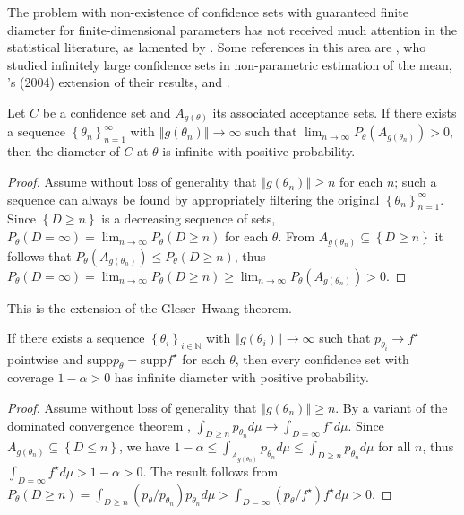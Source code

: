 \documentclass[twoside]{article}
\begin{document}
The problem with non-existence
of confidence sets with guaranteed finite diameter for finite-dimensional
parameters has not received much attention in the statistical literature,
as lamented by \citet{gleser996bootstrap}. Some references in this
area are \citet{bahadur1956nonexistence}, who studied infinitely
large confidence sets in non-parametric estimation of the mean, \citeauthor{romano2004non}'s
(2004) extension of their results, \citet{Donoho1988-hg} and \citet{Pfanzagl1998-fe}.
\begin{lem}
Let $C$ be a confidence set and $A_{g(\theta)}$ its associated
acceptance sets. If there exists a sequence $\left\{ \theta_{n}\right\} _{n=1}^{\infty}$
with $\left\Vert g(\theta_{n})\right\Vert \to\infty$ such
that $\lim_{n\to\infty}P_{\theta}(A_{g(\theta_{n})})>0,$then
the diameter of $C$ at $\theta$ is infinite with positive probability.
\end{lem}
\begin{proof}
Assume without loss of generality that $\left\Vert g(\theta_{n})\right\Vert \geq n$
for each $n$; such a sequence can always be found by appropriately
filtering the original $\left\{ \theta_{n}\right\} _{n=1}^{\infty}$.
Since $\left\{ D\geq n\right\} $ is a decreasing sequence of sets,
$P_{\theta}(D=\infty)=\lim_{n\to\infty}P_{\theta}(D\geq n)$
for each $\theta$. From $A_{g(\theta_{n})}\subseteq\left\{ D\geq n\right\} $
it follows that $P_{\theta}(A_{g(\theta_{n})})\leq P_{\theta}(D\geq n)$,
thus $P_{\theta}(D=\infty)=\lim_{n\to\infty}P_{\theta}(D\geq n)\geq\lim_{n\to\infty}P_{\theta}(A_{g(\theta_{n})})>0$.
\end{proof}
This is the extension of the Gleser--Hwang theorem.
\begin{thm}
\label{thm:Infinite diameter main theorem}If there exists a sequence
$\left\{ \theta_{i}\right\} _{i\in\mathbb{N}}$ with $\left\Vert g(\theta_{i})\right\Vert \to\infty$
such that $p_{\theta_{i}}\to f^{\star}$ pointwise and $\textrm{supp}p_{\theta}=\textrm{supp}f^{\star}$
for each $\theta$, then every confidence set with coverage $1-\alpha>0$
has infinite diameter with positive probability.
\end{thm}
\begin{proof}
Assume without loss of generality that $\left\Vert g(\theta_{n})\right\Vert \geq n$.
By a variant of the dominated convergence theorem \citep[Exercise 16.4a]{billingsley1995probability}, $\int_{D\geq n}p_{\theta_{n}}d\mu\to\int_{D=\infty}f^{\star}d\mu$.
Since $A_{g(\theta_{n})}\subseteq\left\{ D\leq n\right\}$, we have 
$1-\alpha\leq\int_{A_{g(\theta_{n})}}p_{\theta_{n}}d\mu\leq\int_{D\geq n}p_{\theta_{n}}d\mu$
for all $n$, thus $\int_{D=\infty}f^{\star}d\mu>1-\alpha>0$. The
result follows from $P_{\theta}(D\geq n)=\int_{D\geq n}(p_{\theta}/p_{\theta_{n}})p_{\theta_{n}}d\mu>\int_{D=\infty}(p_{\theta}/f^{\star})f^{\star}d\mu>0$.
\end{proof}
\end{document}
